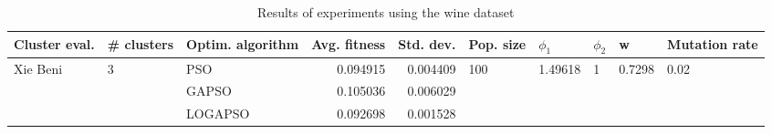 \begin{table}
\centering
\caption{Results of experiments using the wine dataset}
\begin{tabular}{lllrrlllll}
\toprule
            Cluster eval. &        \# clusters & Optim. algorithm &  Avg. fitness &  Std. dev. &            Pop. size &               $\phi_{1}$ &         $\phi_{2}$ &                       w &         Mutation rate \\
\midrule
\multirow{3}{*}{Xie Beni} & \multirow{3}{*}{3} &              PSO &      0.094915 &   0.004409 & \multirow{3}{*}{100} & \multirow{3}{*}{1.49618} & \multirow{3}{*}{1} & \multirow{3}{*}{0.7298} & \multirow{3}{*}{0.02} \\
                          &                    &            GAPSO &      0.105036 &   0.006029 &                      &                          &                    &                         &                       \\
                          &                    &          LOGAPSO &      0.092698 &   0.001528 &                      &                          &                    &                         &                       \\
\bottomrule
\end{tabular}
\end{table}
